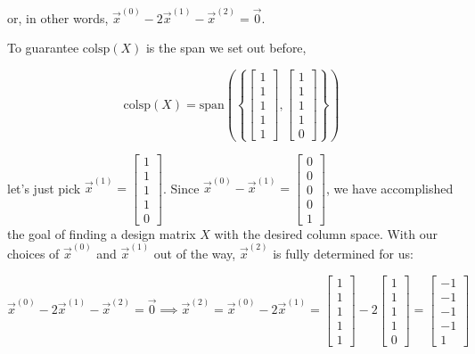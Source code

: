 \documentclass[11pt]{article}
\begin{document}
\begin{prob}[(19 pts)]
\begin{subprob}
\begin{solution}
or, in other words, $\vec x^{(0)} - 2\vec x^{(1)} - \vec x^{(2)} = \vec 0
$.

\vspace{2in}

To guarantee $\text{colsp}(X)$ is the span we set out before,

$$\text{colsp}(X) = \text{span} \left( \left\{ \begin{bmatrix} 1 \\ 1 \\ 1 \\ 1 \\ 1 \end{bmatrix}, \begin{bmatrix} 1 \\ 1 \\ 1 \\ 1 \\ 0 \end{bmatrix}\right\} \right)$$

let's just pick $\vec x^{(1)} = \begin{bmatrix} 1 \\ 1 \\ 1 \\ 1 \\ 0 \end{bmatrix}$. Since $\vec x^{(0)} - \vec x^{(1)} = \begin{bmatrix} 0 \\ 0 \\ 0 \\ 0 \\ 1 \end{bmatrix}$, we have accomplished the goal of finding a design matrix $X$ with the desired column space. With our choices of $\vec x^{(0)}$ and $\vec x^{(1)}$ out of the way, $\vec x^{(2)}$ is fully determined for us:

$$\vec x^{(0)} - 2 \vec x^{(1)} - \vec x^{(2)} = \vec 0 \implies \vec x^{(2)} = \vec x^{(0)} - 2 \vec x^{(1)} = \begin{bmatrix} 1 \\ 1 \\ 1 \\ 1 \\ 1 \end{bmatrix} - 2 \begin{bmatrix} 1 \\ 1 \\ 1 \\ 1 \\ 0 \end{bmatrix} = \begin{bmatrix} -1 \\ -1 \\ -1 \\ -1 \\ 1 \end{bmatrix}$$


\end{solution}
\end{subprob}
\end{prob}
\end{document}
